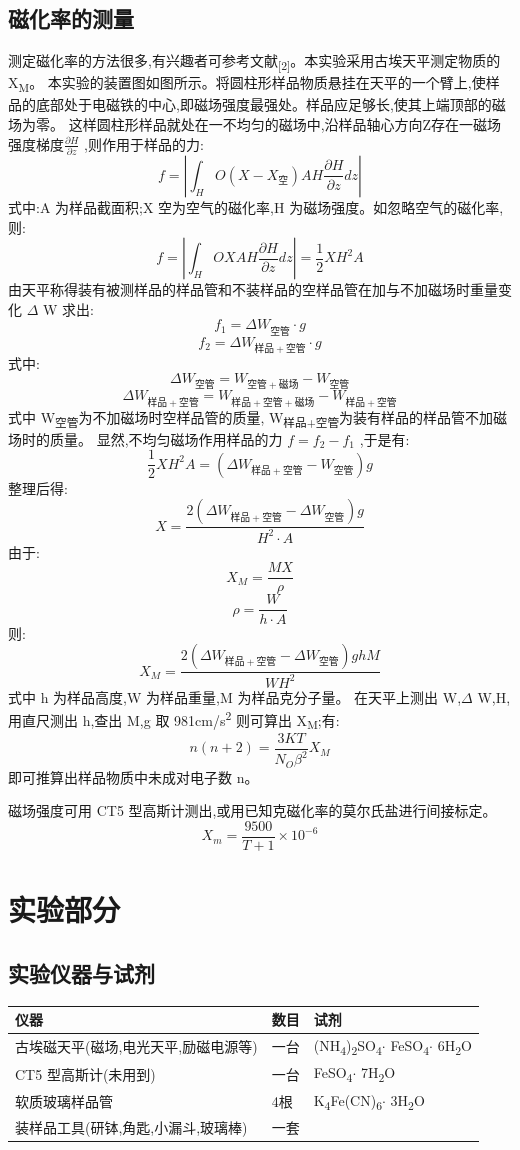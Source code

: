 \documentclass[11pt]{report}
\begin{document}
\chapter{磁化率的测量}
\label{sec:orgfffe0d2}
测定磁化率的方法很多,有兴趣者可参考文献\textsubscript{[2]}。本实验采用古埃天平测定物质的 X\textsubscript{M}。
本实验的装置图如图所示。将圆柱形样品物质悬挂在天平的一个臂上,使样
品的底部处于电磁铁的中心,即磁场强度最强处。样品应足够长,使其上端顶部的磁场为零。
这样圆柱形样品就处在一不均匀的磁场中,沿样品轴心方向Z存在一磁场强度梯度\(\frac{\partial H}{\partial z}\) ,则作用于样品的力:
\[
f=\left|\int_{H}{O}(X-X_{空})AH\frac{\partial H}{\partial z}dz\right|
\]
式中:A 为样品截面积;X 空为空气的磁化率,H 为磁场强度。如忽略空气的磁化率,则:
\[
f=\left|\int_{H}{O}XAH\frac{\partial H}{\partial z}dz\right|=\frac{1}{2}XH^{2}A
\]
由天平称得装有被测样品的样品管和不装样品的空样品管在加与不加磁场时重量变化
\(\Delta\) W 求出:
\[
f_{1}=\Delta W_{空管}\cdot g
\]
\[
f_{2}=\Delta W_{样品+空管}\cdot g
\]
式中:
\[
\Delta W_{空管}=W_{空管+磁场}-W_{空管}
\]
\[
\Delta W_{样品+空管}=W_{样品+空管+磁场}-W_{样品+空管}
\]
式中 W\textsubscript{空管}为不加磁场时空样品管的质量, W\textsubscript{样品+空管}为装有样品的样品管不加磁场时的质量。
显然,不均匀磁场作用样品的力 \(f = f_{2}-f_{1}\) ,于是有:
\[
\frac{1}{2}XH^{2}A=(\Delta W_{样品+空管}-W_{空管})g
\]
整理后得:
\[
X=\frac{2(\Delta W_{样品+空管}-\Delta W_{空管})g}{H^{2}\cdot A}
\]
由于:
\[
X_{M}=\frac{MX}{\rho}
\]
\[
\rho=\frac{W}{h\cdot A}
\]
则:
\[
X_{M}=\frac{2(\Delta W_{样品+空管}-\Delta W_{空管})ghM}{WH^{2}}
\]
式中 h 为样品高度,W 为样品重量,M 为样品克分子量。
在天平上测出 W,\(\Delta\) W,H,用直尺测出 h,查出 M,g 取 981cm/s\textsuperscript{2} 则可算出 X\textsubscript{M};有:
\[
n(n+2)=\frac{3KT}{N_{O}\beta^{2}}X_{M}
\]
即可推算出样品物质中未成对电子数 n。

磁场强度可用 CT5 型高斯计测出,或用已知克磁化率的莫尔氏盐进行间接标定。
\[
X_{m}=\frac{9500}{T+1}\times 10^{-6}
\]
\part{实验部分}
\label{sec:orgf3f971a}
\chapter{实验仪器与试剂}
\label{sec:org4748c7a}
\begin{center}
\begin{tabular}{lll}
仪器 & 数目 & 试剂\\
\hline
古埃磁天平(磁场,电光天平,励磁电源等) & 一台 & (NH\textsubscript{4})\textsubscript{2}SO\textsubscript{4}\(\cdot\) FeSO\textsubscript{4}\(\cdot\) 6H\textsubscript{2}O\\
CT5 型高斯计(未用到) & 一台 & FeSO\textsubscript{4}\(\cdot\) 7H\textsubscript{2}O\\
软质玻璃样品管 & 4根 & K\textsubscript{4}Fe(CN)\textsubscript{6}\(\cdot\) 3H\textsubscript{2}O\\
装样品工具(研钵,角匙,小漏斗,玻璃棒) & 一套 & \\
\end{tabular}
\end{center}
\end{document}

